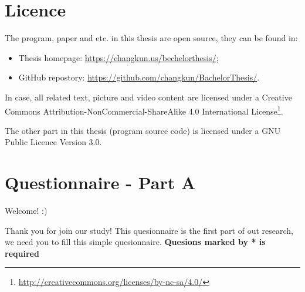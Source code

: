 
\appendix

  \chapter{Licence}
  \label{appendix:a}

  The program, paper and etc. in this thesis are open source, they can be found in:
    \begin{itemize}
        \item Thesis homepage: \url{https://changkun.us/bechelorthesis/};
        \item GitHub repostory: \url{https://github.com/changkun/BachelorThesis/}.
    \end{itemize}



  In case, all related text, picture and video content are licensed under a Creative Commons Attribution-NonCommercial-ShareAlike 4.0 International License\footnote{\url{http://creativecommons.org/licenses/by-nc-sa/4.0/}}.

  The other part in this thesis (program source code) is licensed under a GNU Public Licence Version 3.0.


  \cleardoublepage

  \chapter{Questionnaire - Part A}
  \label{appendix:b}

  Welcome! :)

  Thank you for join our study! This quesionnaire is the first part of out research, we need you to fill this simple quesionnaire.
  \textbf{Quesions marked by * is required}

